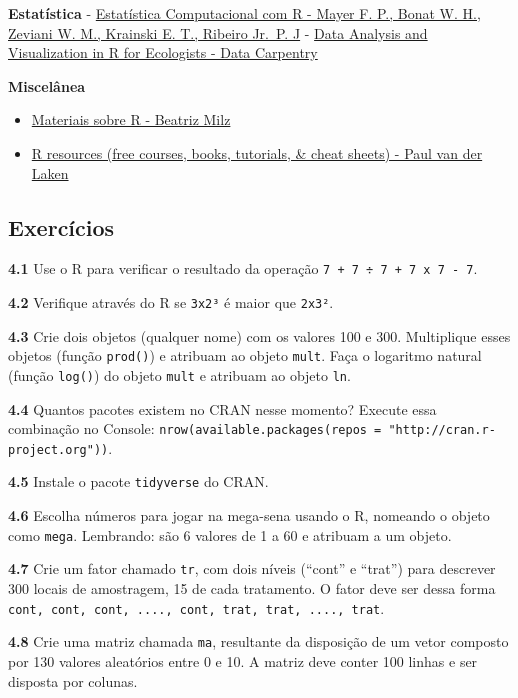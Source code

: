 \documentclass[
]{article}
\providecommand{\tightlist}{%
  \setlength{\itemsep}{0pt}\setlength{\parskip}{0pt}}
\begin{document}
\textbf{Estatística}
- \href{http://cursos.leg.ufpr.br/ecr/index.html}{Estatística Computacional com R - Mayer F. P., Bonat W. H., Zeviani W. M., Krainski E. T., Ribeiro Jr.~P. J}
- \href{https://datacarpentry.org/R-ecology-lesson/index.html}{Data Analysis and Visualization in R for Ecologists - Data Carpentry}

\textbf{Miscelânea}

\begin{itemize}
\tightlist
\item
  \href{https://materiais-estudo-r.netlify.app/}{Materiais sobre R - Beatriz Milz}
\item
  \href{https://paulvanderlaken.com/2017/08/10/r-resources-cheatsheets-tutorials-books}{R resources (free courses, books, tutorials, \& cheat sheets) - Paul van der Laken}
\end{itemize}

\hypertarget{exercuxedcios}{%
\subsection{Exercícios}\label{exercuxedcios}}

\textbf{4.1}
Use o R para verificar o resultado da operação \texttt{7\ +\ 7\ ÷\ 7\ +\ 7\ x\ 7\ -\ 7}.

\textbf{4.2}
Verifique através do R se \texttt{3x2³} é maior que \texttt{2x3²}.

\textbf{4.3}
Crie dois objetos (qualquer nome) com os valores 100 e 300. Multiplique esses objetos (função \texttt{prod()}) e atribuam ao objeto \texttt{mult}. Faça o logaritmo natural (função \texttt{log()}) do objeto \texttt{mult} e atribuam ao objeto \texttt{ln}.

\textbf{4.4}
Quantos pacotes existem no CRAN nesse momento? Execute essa combinação no Console: \texttt{nrow(available.packages(repos\ =\ "http://cran.r-project.org"))}.

\textbf{4.5}
Instale o pacote \texttt{tidyverse} do CRAN.

\textbf{4.6}
Escolha números para jogar na mega-sena usando o R, nomeando o objeto como \texttt{mega}. Lembrando: são 6 valores de 1 a 60 e atribuam a um objeto.

\textbf{4.7}
Crie um fator chamado \texttt{tr}, com dois níveis (``cont'' e ``trat'') para descrever 300 locais de amostragem, 15 de cada tratamento. O fator deve ser dessa forma \texttt{cont,\ cont,\ cont,\ ....,\ cont,\ trat,\ trat,\ ....,\ trat}.

\textbf{4.8}
Crie uma matriz chamada \texttt{ma}, resultante da disposição de um vetor composto por 130 valores aleatórios entre 0 e 10. A matriz deve conter 100 linhas e ser disposta por colunas.
\end{document}
